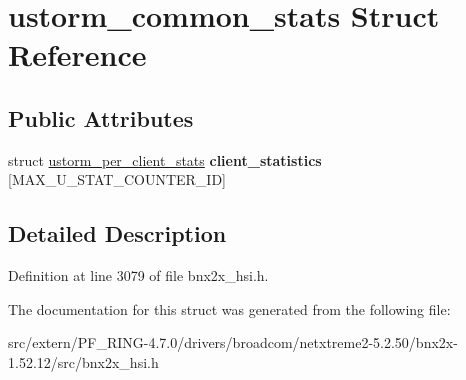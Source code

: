 \hypertarget{structustorm__common__stats}{
\section{ustorm\_\-common\_\-stats Struct Reference}
\label{structustorm__common__stats}
}
\subsection*{Public Attributes}
\begin{DoxyCompactItemize}
\item 
\hypertarget{structustorm__common__stats_a82ac423bcf8d122168024b0ab5b3e996}{
struct \hyperlink{structustorm__per__client__stats}{ustorm\_\-per\_\-client\_\-stats} {\bfseries client\_\-statistics} \mbox{[}MAX\_\-U\_\-STAT\_\-COUNTER\_\-ID\mbox{]}}
\label{structustorm__common__stats_a82ac423bcf8d122168024b0ab5b3e996}

\end{DoxyCompactItemize}


\subsection{Detailed Description}


Definition at line 3079 of file bnx2x\_\-hsi.h.



The documentation for this struct was generated from the following file:\begin{DoxyCompactItemize}
\item 
src/extern/PF\_\-RING-\/4.7.0/drivers/broadcom/netxtreme2-\/5.2.50/bnx2x-\/1.52.12/src/bnx2x\_\-hsi.h\end{DoxyCompactItemize}
